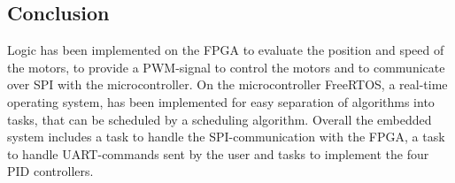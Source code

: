 \documentclass[../../main.tex]{subfiles}
\begin{document}
\subsection{Conclusion}

Logic has been implemented on the FPGA to evaluate the position and speed of the motors, to provide a PWM-signal to control the motors and to communicate over SPI with the microcontroller. On the microcontroller FreeRTOS, a real-time operating system, has been implemented for easy separation of algorithms into tasks, that can be scheduled by a scheduling algorithm. Overall the embedded system includes a task to handle the SPI-communication with the FPGA, a task to handle UART-commands sent by the user and tasks to implement the four PID controllers.   
\end{document}
